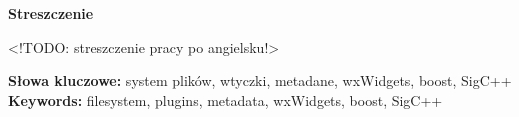 \clearpage

\begin{center}
\textbf{Streszczenie}
\end{center}

<!TODO: streszczenie pracy po angielsku!>

\vspace*{\baselineskip}

\noindent\textbf{Słowa kluczowe:} system plików, wtyczki, metadane, wxWidgets, boost, SigC++
\noindent\textbf{Keywords:} filesystem, plugins, metadata, wxWidgets, boost, SigC++
